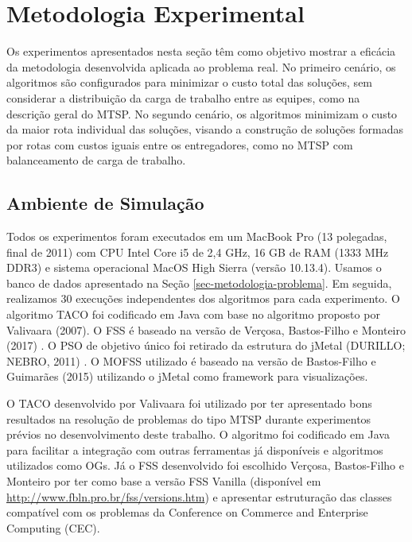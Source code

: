 \section{Metodologia Experimental}
\label{sec-metodologia-experimento}

Os experimentos apresentados nesta seção têm como objetivo mostrar a eficácia da metodologia desenvolvida aplicada ao problema real. No primeiro cenário, os algoritmos são configurados para minimizar o custo total das soluções, sem considerar a distribuição da carga de trabalho entre as equipes, como na descrição geral do MTSP. No segundo cenário, os algoritmos minimizam o custo da maior rota individual das soluções, visando a construção de soluções formadas por rotas com custos iguais entre os entregadores, como no MTSP com balanceamento de carga de trabalho.

\subsection{Ambiente de Simulação}
\label{subsec-metodologia-experimento}

Todos os experimentos foram executados em um MacBook Pro (13 polegadas, final de 2011) com CPU Intel Core i5 de 2,4 GHz, 16 GB de RAM (1333 MHz DDR3) e sistema operacional MacOS High Sierra (versão 10.13.4). Usamos o banco de dados apresentado na Seção \ref{sec-metodologia-problema}. Em seguida, realizamos 30 execuções independentes dos algoritmos para cada experimento. O algoritmo TACO foi codificado em Java com base no algoritmo proposto por Valivaara (2007). O FSS é baseado na versão de Verçosa, Bastos-Filho e Monteiro (2017) \cite{verccosa2017combining}. O PSO de objetivo único foi retirado da estrutura do jMetal (DURILLO; NEBRO, 2011) \cite{durillo2011jmetal}. O MOFSS utilizado é baseado na versão de Bastos-Filho e Guimarães (2015) \cite{bastos2015multi} utilizando o jMetal como framework para visualizações.

O TACO desenvolvido por Valivaara foi utilizado por ter apresentado bons resultados na resolução de problemas do tipo MTSP durante experimentos prévios no desenvolvimento deste trabalho. O algoritmo foi codificado em Java para facilitar a integração com outras ferramentas já disponíveis e algoritmos utilizados como OGs. Já o FSS desenvolvido foi escolhido Verçosa, Bastos-Filho e Monteiro por ter como base a versão FSS Vanilla (disponível em \url{http://www.fbln.pro.br/fss/versions.htm}) e apresentar estruturação das classes compatível com os problemas da Conference on Commerce and Enterprise Computing (CEC). 

